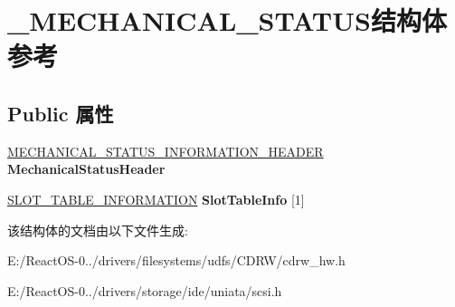 \hypertarget{struct___m_e_c_h_a_n_i_c_a_l___s_t_a_t_u_s}{}\section{\+\_\+\+M\+E\+C\+H\+A\+N\+I\+C\+A\+L\+\_\+\+S\+T\+A\+T\+U\+S结构体 参考}
\label{struct___m_e_c_h_a_n_i_c_a_l___s_t_a_t_u_s}
\subsection*{Public 属性}
\begin{DoxyCompactItemize}
\item 
\mbox{\label{struct___m_e_c_h_a_n_i_c_a_l___s_t_a_t_u_s_a0f70dfcf7273f7e47e7f72d99c24dbb8}} 
\hyperlink{struct___m_e_c_h_a_n_i_c_a_l___s_t_a_t_u_s___i_n_f_o_r_m_a_t_i_o_n___h_e_a_d_e_r}{M\+E\+C\+H\+A\+N\+I\+C\+A\+L\+\_\+\+S\+T\+A\+T\+U\+S\+\_\+\+I\+N\+F\+O\+R\+M\+A\+T\+I\+O\+N\+\_\+\+H\+E\+A\+D\+ER} {\bfseries Mechanical\+Status\+Header}
\item 
\mbox{\label{struct___m_e_c_h_a_n_i_c_a_l___s_t_a_t_u_s_a563d753fafe4c81c3ca37edc317fb47e}} 
\hyperlink{struct___s_l_o_t___t_a_b_l_e___i_n_f_o_r_m_a_t_i_o_n}{S\+L\+O\+T\+\_\+\+T\+A\+B\+L\+E\+\_\+\+I\+N\+F\+O\+R\+M\+A\+T\+I\+ON} {\bfseries Slot\+Table\+Info} \mbox{[}1\mbox{]}
\end{DoxyCompactItemize}


该结构体的文档由以下文件生成\+:\begin{DoxyCompactItemize}
\item 
E\+:/\+React\+O\+S-\/0../drivers/filesystems/udfs/\+C\+D\+R\+W/cdrw\+\_\+hw.\+h\item 
E\+:/\+React\+O\+S-\/0../drivers/storage/ide/uniata/scsi.\+h\end{DoxyCompactItemize}
